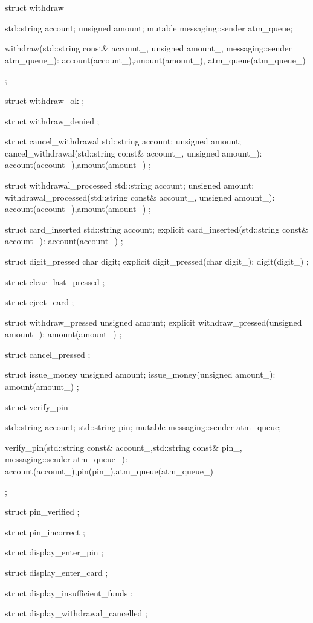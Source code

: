\begin{cpp}
struct withdraw
{
  std::string account;
  unsigned amount;
  mutable messaging::sender atm_queue;

  withdraw(std::string const& account_,
           unsigned amount_,
           messaging::sender atm_queue_):
    account(account_),amount(amount_),
    atm_queue(atm_queue_)
  {}
};

struct withdraw_ok
{};

struct withdraw_denied
{};

struct cancel_withdrawal
{
  std::string account;
  unsigned amount;
  cancel_withdrawal(std::string const& account_,
                    unsigned amount_):
    account(account_),amount(amount_)
  {}
};

struct withdrawal_processed
{
  std::string account;
  unsigned amount;
  withdrawal_processed(std::string const& account_,
                       unsigned amount_):
    account(account_),amount(amount_)
  {}
};

struct card_inserted
{
  std::string account;
  explicit card_inserted(std::string const& account_):
    account(account_)
  {}
};

struct digit_pressed
{
  char digit;
  explicit digit_pressed(char digit_):
    digit(digit_)
  {}
};

struct clear_last_pressed
{};

struct eject_card
{};

struct withdraw_pressed
{
  unsigned amount;
  explicit withdraw_pressed(unsigned amount_):
    amount(amount_)
  {}
};

struct cancel_pressed
{};

struct issue_money
{
  unsigned amount;
  issue_money(unsigned amount_):
    amount(amount_)
  {}
};

struct verify_pin
{
  std::string account;
  std::string pin;
  mutable messaging::sender atm_queue;

  verify_pin(std::string const& account_,std::string const& pin_,
             messaging::sender atm_queue_):
    account(account_),pin(pin_),atm_queue(atm_queue_)
  {}
};

struct pin_verified
{};

struct pin_incorrect
{};

struct display_enter_pin
{};

struct display_enter_card
{};

struct display_insufficient_funds
{};

struct display_withdrawal_cancelled
{};


\end{cpp}
